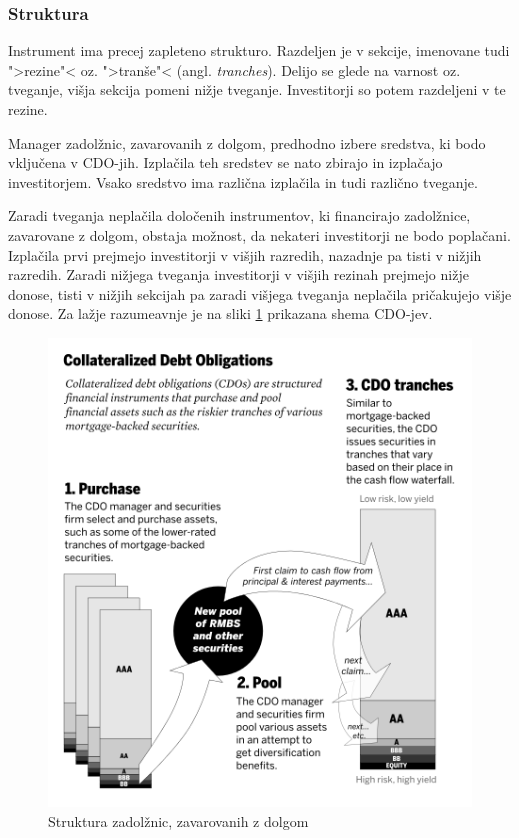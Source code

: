 \documentclass[12pt,a4paper]{amsart}
\theoremstyle{definition} %
\theoremstyle{plain} %
\begin{document}
\subsubsection{Struktura}
Instrument ima precej zapleteno strukturo. Razdeljen je v sekcije, imenovane tudi 
">rezine"< oz. ">tranše"< (angl. \textit{tranches}). Delijo se glede na varnost oz. tveganje, 
višja sekcija pomeni nižje tveganje. Investitorji so potem razdeljeni v te rezine. 

Manager zadolžnic, zavarovanih z dolgom, predhodno izbere sredstva, ki bodo 
vključena v CDO-jih. Izplačila teh sredstev se nato zbirajo in izplačajo investitorjem. 
Vsako sredstvo ima različna izplačila in tudi različno tveganje.

Zaradi tveganja neplačila določenih instrumentov, ki financirajo zadolžnice, zavarovane 
z dolgom, obstaja možnost, da nekateri investitorji ne bodo poplačani. Izplačila prvi 
prejmejo investitorji v višjih razredih, nazadnje pa tisti v nižjih razredih. Zaradi 
nižjega tveganja investitorji v višjih rezinah prejmejo nižje donose, tisti v nižjih 
sekcijah pa zaradi višjega tveganja neplačila pričakujejo višje donose. Za lažje 
razumeavnje je na sliki \ref{cdo_structure} prikazana shema CDO-jev. 

\begin{figure}[h]
\centerline{\includegraphics[scale=0.5]{CDO_structure.png}}
\caption{Struktura zadolžnic, zavarovanih z dolgom}
\label{cdo_structure}
\end{figure}
\end{document}
